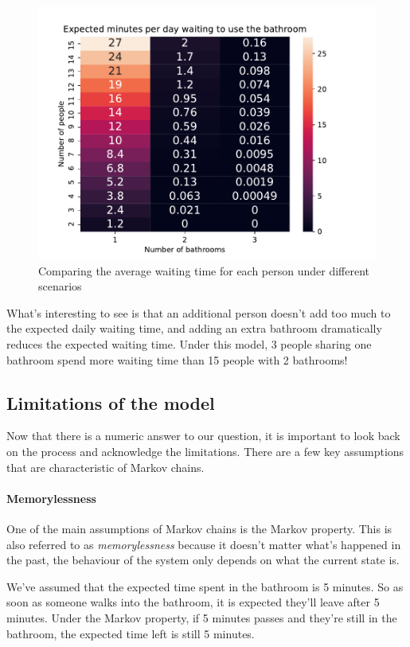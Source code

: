 \begin{figure}[H]
	\centering
	\includegraphics[scale=1]{../../images/comparison}
	\caption{Comparing the average waiting time for each person under different scenarios}
	\label{fig: comparison}
\end{figure}

What's interesting to see is that an additional person doesn't add too much to the expected daily waiting time, and adding an extra bathroom dramatically reduces the expected waiting time. Under this model, 3 people sharing one bathroom spend more waiting time than 15 people with 2 bathrooms!

\subsection*{Limitations of the model}
Now that there is a numeric answer to our question, it is important to look back on the process and acknowledge the limitations. There are a few key assumptions that are characteristic of Markov chains.

\paragraph{Memorylessness}
One of the main assumptions of Markov chains is the Markov property. This is also referred to as \textit{memorylessness} because it doesn't matter what's happened in the past, the behaviour of the system only depends on what the current state is. 

We've assumed that the expected time spent in the bathroom is 5 minutes. So as soon as someone walks into the bathroom, it is expected they'll leave after 5 minutes. Under the Markov property, if 5 minutes passes and they're still in the bathroom, the expected time left is still 5 minutes.

